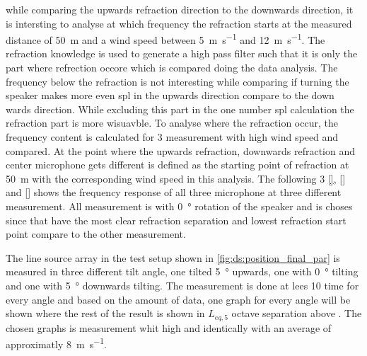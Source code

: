 while comparing the upwards refraction direction to the downwards direction, it is intersting to analyse at which frequency the refraction starts at the measured distance of \SI{50}{\meter} and a wind speed between \SI{5}{\meter\per\second} and \SI{12}{\meter\per\second}. The refraction knowledge is used to generate a high pass filter such that it is only the part where refrection occore which is compared doing the data analysis. The frequency below the refraction is not interesting while comparing if turning the speaker makes more even \gls{spl} in the upwards direction compare to the down wards direction. While excluding this part in the one number \gls{spl} calculation the refraction part is more wisuavble. To analyse where the refraction occur, the frequency content is calculated for 3 measurement with high wind speed and compared. At the point where the upwards refraction, downwards refraction and center microphone gets different is defined as the starting point of refraction at \SI{50}{\meter} with the corresponding wind speed in this analysis. The following 3 \autoref{}, \autoref{} and \autoref{} shows the frequency response of all three microphone at three different measurement. All measurement is with \SI{0}{\degree} rotation of the speaker and is choses since that have the most clear refraction separation and lowest refraction start point compare to the other measurement.




The line source array in the test setup shown in \autoref{fig:ds:position_final_par} is measured in three different tilt angle, one tilted \SI{5}{\degree} upwards, one with \SI{0}{\degree} tilting and one with \SI{5}{\degree} downwards tilting. The measurement is done at lees 10 time for every angle and based on the amount of data, one graph for every angle will be shown where the rest of the result is shown in $L_{eq,5}$ octave separation above . The chosen graphs is measurement whit high and identically with an average of approximatly \SI{8}{\meter\per\second}.


